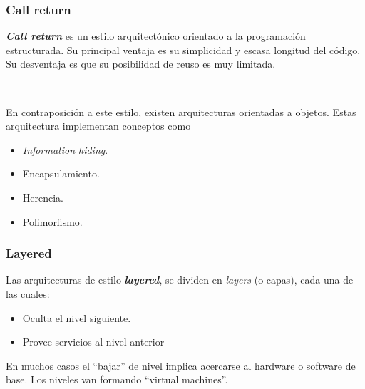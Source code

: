 \documentclass[]{article}
\begin{document}
\subsubsection{Call return}
\textbf{\emph{Call return}} es un estilo arquitectónico orientado a la programación estructurada. Su principal ventaja es su simplicidad y escasa longitud del código. Su desventaja es que su posibilidad de reuso es muy limitada.


~\newline

En contraposición a este estilo, existen arquitecturas orientadas a objetos. Estas arquitectura implementan conceptos como
\begin{itemize}
    \item \emph{Information hiding}.
    \item Encapsulamiento.
    \item Herencia.
    \item Polimorfismo.
\end{itemize}


\subsubsection{Layered}
Las arquitecturas de estilo \textbf{\emph{layered}}, se dividen en \emph{layers} (o capas), cada una de las cuales:
\begin{itemize}
    \item Oculta el nivel siguiente.
    \item Provee servicios al nivel anterior
\end{itemize}

En muchos casos el ``bajar'' de nivel implica acercarse al hardware o software de base. Los niveles van formando ``virtual machines''.
\end{document}
